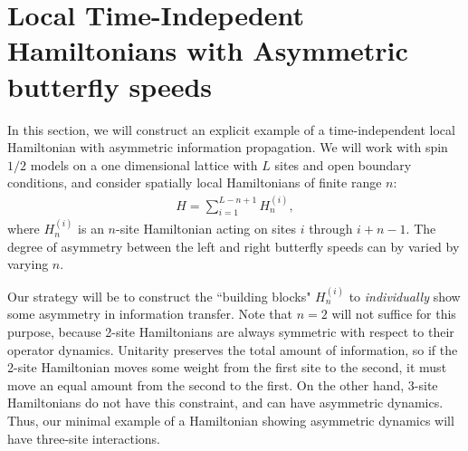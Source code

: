 \documentclass[aps,prx,reprint,superscriptaddress, longbibliography]{revtex4-1}
\begin{document}

\section{Local Time-Indepedent Hamiltonians with Asymmetric butterfly speeds}
\label{sec:ham}
In this section, we will construct an explicit example of a time-independent local Hamiltonian with asymmetric information propagation. We will work with spin $1/2$ models on a one dimensional lattice with $L$ sites and open boundary conditions, and consider spatially local Hamiltonians of finite range $n$:
\begin{align}
H = \sum_{i=1}^{L-n+1}H_n^{(i)},
\label{eqn:chain}
\end{align}
where $H_n^{(i)}$ is an $n$-site Hamiltonian acting on sites $i$ through $i+n-1$. The degree of asymmetry between the left and right butterfly speeds can by varied by varying $n$. 

Our strategy will be to construct the ``building blocks" $H_n^{(i)}$ to \emph{individually} show some asymmetry in information transfer. Note that $n=2$ will not suffice for this purpose, because 2-site Hamiltonians are always symmetric with respect to their operator dynamics. Unitarity preserves the total amount of information, so if the 2-site Hamiltonian moves some weight from the first site to the second, it must move an equal amount from the second to the first. On the other hand, 3-site Hamiltonians do not have this constraint, and can have asymmetric dynamics. Thus, our minimal example of a Hamiltonian showing asymmetric dynamics will have three-site interactions. 
\end{document}
